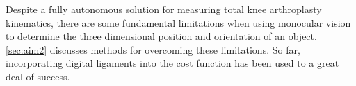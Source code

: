 Despite a fully autonomous solution for measuring total knee arthroplasty kinematics, there are some fundamental limitations when using monocular vision to determine the three dimensional position and orientation of an object.
\cref{sec:aim2} discusses methods for overcoming these limitations.
So far, incorporating digital ligaments into the cost function has been used to a great deal of success.
